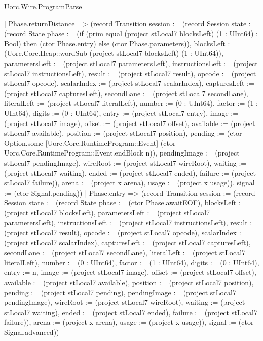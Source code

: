 \begin{lexlean}{Uorc.Wire.ProgramParse}
\begin{semanticmodule}
{    | Phase.returnDistance => (record Transition {session := (record Session {state := (record State {phase := (if (prim equal (project stLocal7 blocksLeft) (1 : UInt64) : Bool) then (ctor Phase.entry) else (ctor Phase.parameters)), blocksLeft := (Uorc.Core.Heap::wordSub (project stLocal7 blocksLeft) (1 : UInt64)), parametersLeft := (project stLocal7 parametersLeft), instructionsLeft := (project stLocal7 instructionsLeft), result := (project stLocal7 result), opcode := (project stLocal7 opcode), scalarIndex := (project stLocal7 scalarIndex), capturesLeft := (project stLocal7 capturesLeft), secondLane := (project stLocal7 secondLane), literalLeft := (project stLocal7 literalLeft), number := (0 : UInt64), factor := (1 : UInt64), digits := (0 : UInt64), entry := (project stLocal7 entry), image := (project stLocal7 image), offset := (project stLocal7 offset), available := (project stLocal7 available), position := (project stLocal7 position), pending := (ctor Option.some [Uorc.Core.RuntimeProgram::Event] (ctor Uorc.Core.RuntimeProgram::Event.endBlock n)), pendingImage := (project stLocal7 pendingImage), wireRoot := (project stLocal7 wireRoot), waiting := (project stLocal7 waiting), ended := (project stLocal7 ended), failure := (project stLocal7 failure)}), arena := (project x arena), usage := (project x usage)}), signal := (ctor Signal.pending)})
    | Phase.entry => (record Transition {session := (record Session {state := (record State {phase := (ctor Phase.awaitEOF), blocksLeft := (project stLocal7 blocksLeft), parametersLeft := (project stLocal7 parametersLeft), instructionsLeft := (project stLocal7 instructionsLeft), result := (project stLocal7 result), opcode := (project stLocal7 opcode), scalarIndex := (project stLocal7 scalarIndex), capturesLeft := (project stLocal7 capturesLeft), secondLane := (project stLocal7 secondLane), literalLeft := (project stLocal7 literalLeft), number := (0 : UInt64), factor := (1 : UInt64), digits := (0 : UInt64), entry := n, image := (project stLocal7 image), offset := (project stLocal7 offset), available := (project stLocal7 available), position := (project stLocal7 position), pending := (project stLocal7 pending), pendingImage := (project stLocal7 pendingImage), wireRoot := (project stLocal7 wireRoot), waiting := (project stLocal7 waiting), ended := (project stLocal7 ended), failure := (project stLocal7 failure)}), arena := (project x arena), usage := (project x usage)}), signal := (ctor Signal.advanced)})
}
\end{semanticmodule}
\end{lexlean}
